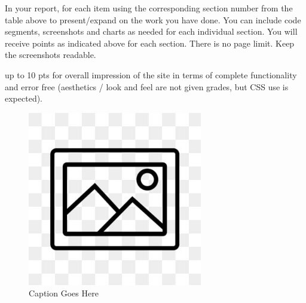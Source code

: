 \documentclass[12pt, letterpaper]{article}
\begin{document}
In your report, for each item using the corresponding section number from the table above to present/expand on the work you have done. You can include code segments, screenshots and charts as needed for each individual section. You will receive points as indicated above for each section. There is no page limit. Keep the screenshots readable.

up to 10 pts for overall impression of the site in terms of complete functionality and error free (aesthetics / look and feel are not given grades, but CSS use is expected).

\begin{figure}[htbp]
	\centering
	\includegraphics[width=3in]{images/placeholder.jpg}
	\caption{Caption Goes Here}
 \end{figure}
\end{document}
